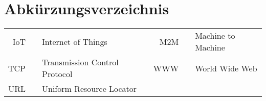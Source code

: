 \section*{Abkürzungsverzeichnis}

\begin{tabular}{rp{0.2cm}lp{1cm}rp{0.2cm}l}
    IoT     & &  Internet of Things   & & M2M    & &  Machine to Machine  \\
    TCP     & &  Transmission Control Protocol & & WWW     & &  World Wide Web \\
	URL     & &  Uniform Resource Locator   \\

	
\end{tabular}
